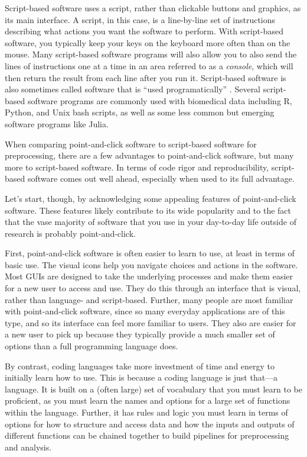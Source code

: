 \documentclass[]{tufte-book}
\begin{document}
Script-based software uses a script, rather than clickable buttons and graphics,
as its main interface. A script, in this case, is a line-by-line set of
instructions describing what actions you want the software to perform. With
script-based software, you typically keep your keys on the keyboard more often
than on the mouse. Many script-based software programs will also allow you to
also send the lines of instructions one at a time in an area referred to as a
\emph{console}, which will then return the result from each line after you run it.
Script-based software is also sometimes called software that is ``used
programatically'' \citep{perkel2018future}. Several script-based software programs are
commonly used with biomedical data including R, Python, and Unix bash scripts,
as well as some less common but emerging software programs like Julia.

When comparing point-and-click software to script-based software for
preprocessing, there are a few advantages to point-and-click software, but
many more to script-based software. In terms of code rigor and reproducibility,
script-based software comes out well ahead, especially when used to its
full advantage.

Let's start, though, by acknowledging some appealing features of point-and-click
software. These features likely contribute to its wide popularity and to the
fact that the vase majority of software that you use in your day-to-day life
outside of research is probably point-and-click.

First, point-and-click software is often easier to learn to use, at least in
terms of basic use. The visual icons help you navigate choices and actions in
the software. Most GUIs are designed to take the underlying processes and
make them easier for a new user to access and use. They do this through
an interface that is visual, rather than language- and script-based.
Further, many people are most familiar with point-and-click
software, since so many everyday applications are of this type, and so its
interface can feel more familiar to users.
They also are easier for a new user to pick up because they typically
provide a much smaller set of options than a full programming language does.

By contrast, coding languages take more investment of time and energy to
initially learn how to use. This is because a coding language is just that---a
language. It is built on a (often large) set of vocabulary that you must learn
to be proficient, as you must learn the names and options for a large set
of functions within the language. Further, it has rules and logic you must learn
in terms of options for how to structure and access data and how the inputs and
outputs of different functions can be chained together to build pipelines for
preprocessing and analysis.
\end{document}
